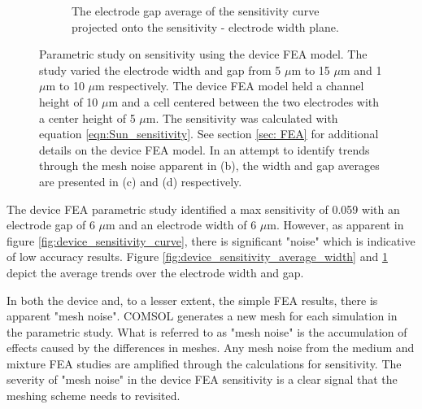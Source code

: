 \begin{figure}[h]
\begin{subfigure}[b]{0.49\textwidth}
        \caption{The electrode gap average of the sensitivity curve projected onto the sensitivity - electrode width plane.}
        \label{fig:device_sensitivity_average_gap}
    \end{subfigure}
    \caption[Device sensitivity]{Parametric study on sensitivity using the device FEA model. The study varied the electrode width and gap from 5 $\mu$m to 15 $\mu$m and 1 $\mu$m to 10 $\mu$m respectively. The device FEA model held a channel height of 10 $\mu$m and a cell centered between the two electrodes with a center height of 5 $\mu$m. The sensitivity was calculated with equation \ref{eqn:Sun_sensitivity}. See section \ref{sec: FEA} for additional details on the device FEA model. In an attempt to identify trends through the mesh noise apparent in (b), the width and gap averages are presented in (c) and (d) respectively.}
    \label{fig:device_sensitivity}
\end{figure}

\par The device FEA parametric study identified a max sensitivity of 0.059 with an electrode gap of 6 $\mu$m and an electrode width of 6 $\mu$m. However, as apparent in figure \ref{fig:device_sensitivity_curve}, there is significant "noise" which is indicative of low accuracy results. Figure \ref{fig:device_sensitivity_average_width} and \ref{fig:device_sensitivity_average_gap} depict the average trends over the electrode width and gap.



\par In both the device and, to a lesser extent, the simple FEA results, there is apparent "mesh noise". COMSOL generates a new mesh for each simulation in the parametric study. What is referred to as "mesh noise" is the accumulation of effects caused by the differences in meshes. Any mesh noise from the medium and mixture FEA studies are amplified through the calculations for sensitivity. The severity of "mesh noise" in the device FEA sensitivity is a clear signal that the meshing scheme needs to revisited.

